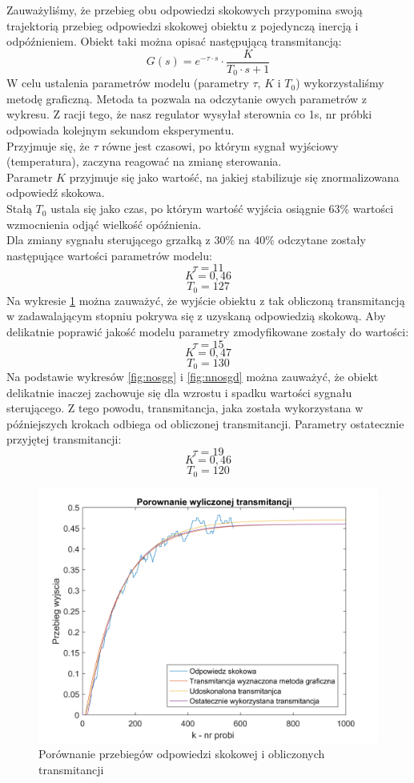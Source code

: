 \documentclass[12pt, a4paper]{article}
\begin{document}
Zauważyliśmy, że przebieg obu odpowiedzi skokowych przypomina swoją trajektorią przebieg odpowiedzi skokowej obiektu z pojedynczą inercją i odpóźnieniem. Obiekt taki można opisać następującą transmitancją:
\[G(s)=e^{-\tau \cdot s} \cdot \frac{K}{T_{0} \cdot s +1}\]
W celu ustalenia parametrów modelu (parametry $\tau$, $K$ i $T_{0}$) wykorzystaliśmy metodę graficzną. Metoda ta pozwala na odczytanie owych parametrów z wykresu. Z racji tego, że nasz regulator wysyłał sterownia co 1s, nr próbki odpowiada kolejnym sekundom eksperymentu. \\
Przyjmuje się, że $\tau$ równe jest czasowi, po którym sygnał wyjściowy (temperatura), zaczyna reagować na zmianę sterowania.\\
Parametr $K$ przyjmuje się jako wartość, na jakiej stabilizuje się znormalizowana odpowiedź skokowa.\\
Stałą $T_{0}$ ustala się jako czas, po którym wartość wyjścia osiągnie $63\%$ wartości wzmocnienia odjąć wielkość opóźnienia.\\ 
Dla zmiany sygnału sterującego grzałką z $30\%$ na $40\%$ odczytane zostały następujące wartości parametrów modelu:
\[\tau=11\]
\[K=0,46\]
\[T_{0}=127\]
Na wykresie \ref{fig:transmi_gglep} można zauważyć, że wyjście obiektu z tak obliczoną transmitancją w zadawalającym stopniu pokrywa się z uzyskaną odpowiedzią skokową. Aby delikatnie poprawić jakość modelu parametry zmodyfikowane zostały do wartości:
\[\tau=15\]
\[K=0,47\]
\[T_{0}=130\]
Na podstawie wykresów \ref{fig:nosgg} i \ref{fig:nnosgd} można zauważyć, że obiekt delikatnie inaczej zachowuje się dla wzrostu i spadku wartości sygnału sterującego. Z tego powodu, transmitancja, jaka została wykorzystana w późniejszych krokach odbiega od obliczonej transmitancji. Parametry ostatecznie przyjętej transmitancji:
\[\tau=19\]
\[K=0,46\]
\[T_{0}=120\]
\begin{figure}[H]
	\centering
	\includegraphics[width=0.9\linewidth]{transmi_gglep}
	\caption{Porównanie przebiegów odpowiedzi skokowej i obliczonych transmitancji}
	\label{fig:transmi_gglep}
\end{figure}
\end{document}
